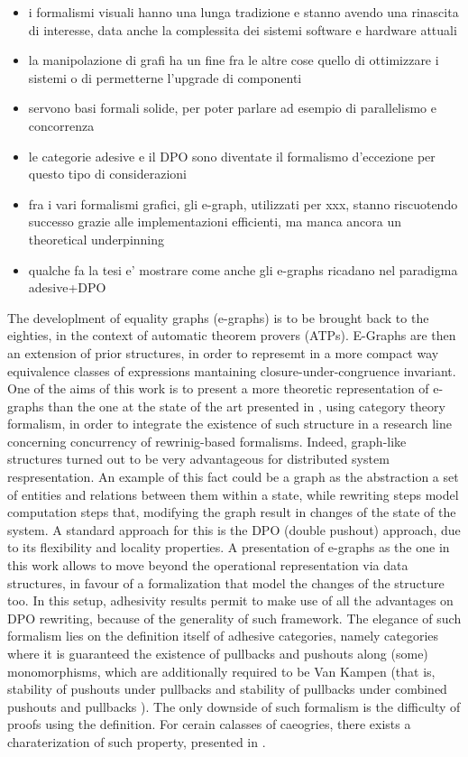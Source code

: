 \begin{itemize}
\item i formalismi visuali hanno una lunga tradizione e stanno avendo una rinascita di interesse, data anche la complessita dei sistemi software e hardware attuali
\item la manipolazione di grafi ha un fine fra le altre cose quello di ottimizzare i sistemi o di permetterne l'upgrade di componenti
\item servono basi formali solide, per poter parlare ad esempio di parallelismo e concorrenza
\item le categorie adesive e il DPO sono diventate il formalismo d'eccezione per questo tipo di considerazioni
\item fra i vari formalismi grafici, gli e-graph, utilizzati per xxx, stanno riscuotendo successo grazie alle implementazioni efficienti, ma manca ancora un theoretical underpinning
\item qualche fa la tesi e' mostrare come anche gli e-graphs ricadano nel paradigma adesive+DPO
\end{itemize}

The developlment of equality graphs (e-graphs) is to be brought back to the eighties, in the context of automatic theorem provers (ATPs). E-Graphs are then an extension of prior structures, in order to represemt in a more compact way equivalence classes of expressions mantaining closure-under-congruence invariant.
One of the aims of this work is to present a more theoretic representation of e-graphs than the one at the state of the art presented in \cite{egg}, using category theory formalism, in order to integrate the existence of such structure in a research line concerning concurrency of rewrinig-based formalisms.
Indeed, graph-like structures turned out to be very advantageous for distributed system respresentation.
An example of this fact could be a graph as the abstraction a set of entities and relations between them within a state, while rewriting steps model computation steps that, modifying the graph result in changes of the state of the system.
A standard approach for this is the DPO (double pushout) approach, due to its flexibility and locality properties.
A presentation of e-graphs as the one in this work allows to move beyond the operational representation via data structures, in favour of a formalization that model the changes of the structure too.
In this setup, adhesivity results permit to make use of all the advantages on DPO rewriting, because of the generality of such framework.
The elegance of such formalism lies on the definition itself of adhesive categories, namely categories where it is guaranteed the existence of pullbacks and pushouts along (some) monomorphisms, which are additionally required to be Van Kampen (that is, stability of pushouts under pullbacks and stability of pullbacks under combined pushouts and pullbacks \cite{Ehrig_Golas}).
The only downside of such formalism is the difficulty of proofs using the definition. For cerain calasses of caeogries, there exists a charaterization of such property, presented in \cite{castelnovo2022newcriterionmathcalmmathcalnadhesivity}.

